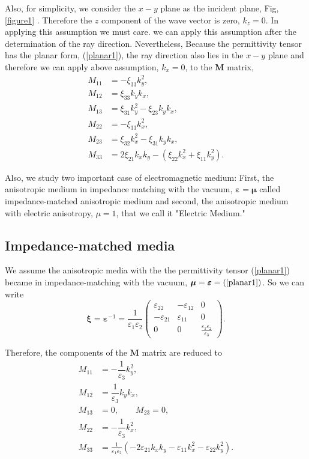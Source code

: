 \documentclass[9pt,twocolumn,twoside]{osajnl}
\begin{document}
 Also, for simplicity, we consider the $x-y$ plane as  the incident plane, Fig, \ref{figure1} . Therefore the $z$ component of the wave vector is zero, $k_{z}=0$. In applying this assumption we must care. we can apply this assumption after the determination of the ray direction. Nevertheless, Because the permittivity tensor has the planar form, (\ref{planar1}), the ray direction also lies in the $x-y$ plane and therefore we can apply above assumption, $k_x=0$, to the $\mathbf{M}$ matrix, 
 \begin{align}\label{m}
M_{11}&=-\xi_{33}k_{y}^{2}, \nonumber\\
M_{12}&=\xi_{33}k_{y}k_{x}, \nonumber\\
M_{13}&=\xi_{31}k_{y}^{2}-\xi_{23}k_{y}k_{x}, \nonumber\\
M_{22}&=-\xi_{33}k_{x}^{2}, \nonumber\\
M_{23}&=\xi_{32}k_{x}^{2}-\xi_{31}k_{y}k_{x},\nonumber\\
M_{33}&=2\xi_{21}k_{x}k_{y}-(\xi_{22}k_{x}^{2}+\xi_{11}k_{y}^{2}).
\end{align}

 Also, we  study two important case of electromagnetic medium: First, the anisotropic medium in impedance matching with the vacuum, $\boldsymbol{\varepsilon}=\boldsymbol{\mu}$ called impedance-matched anisotropic medium and second, the anisotropic medium with electric anisotropy, $\mu=1$, that we call it "Electric Medium."  
 
 \subsection{Impedance-matched media}
We assume the anisotropic media with the the permittivity tensor (\ref{planar1}) became in impedance-matching with the vacuum, $\boldsymbol{\mu}=\boldsymbol{\varepsilon}=(\ref{planar1})$. So we can write
\begin{equation}
\boldsymbol{\xi}=\boldsymbol{\varepsilon}^{-1}=\frac{1}{\varepsilon_{1} \varepsilon_{2}}
        \begin{pmatrix}
             \varepsilon_{22} &-\varepsilon_{12} &0 \\
            -\varepsilon_{21}&\varepsilon_{11}  &0\\
            0&0 &\frac{\varepsilon_{1} \varepsilon_{2}}{\varepsilon_{3}}
        \end{pmatrix}.
\end{equation}

Therefore, the components of the $\mathbf{M}$ matrix are reduced to 
\begin{align}\label{m1}
M_{11}&=-\dfrac{1}{\varepsilon_{3}} k_{y}^{2}, \nonumber\\
M_{12}&=\dfrac{1}{\varepsilon_{3}}k_{y}k_{x}, \nonumber\\
M_{13}&=0, \qquad M_{23}=0,\nonumber\\
M_{22}&=-\dfrac{1}{\varepsilon_{3}}k_{x}^{2}, \nonumber\\
M_{33}&=\frac{1}{\varepsilon_{1} \varepsilon_{2}}\left(-2\varepsilon_{21}k_{x}k_{y}-\varepsilon_{11}k_{x}^{2}-\varepsilon_{22}k_{y}^{2}\right).
\end{align}
\end{document}
